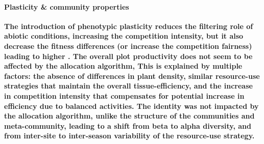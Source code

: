 \paragraph{Plasticity \& community properties}

\textbf{The introduction of phenotypic plasticity reduces the filtering role of abiotic conditions, increasing the competition intensity, but it also decrease the fitness differences (or increase the competition fairness) leading to higher . The overall plot productivity does not seem to be affected by the allocation algorithm, This is explained by multiple factors: the absence of differences in plant density, similar resource-use strategies that maintain the overall tissue-efficiency, and the increase in competition intensity that compensates for potential increase in efficiency due to balanced activities. The identity was not impacted by the allocation algorithm, unlike the structure of the communities and meta-community, leading to a shift from beta to alpha diversity, and from inter-site to inter-season variability of the resource-use strategy.}


\begin{figure}%
    \classiccaptionstyle
{}
\end{figure}


